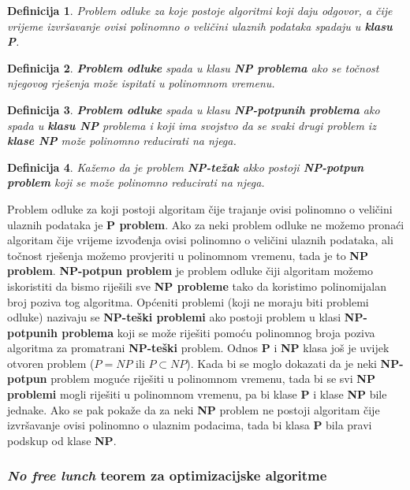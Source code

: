 \documentclass[times, utf8, diplomski, numeric]{fer}
\newtheorem{definition}{Definicija}
\begin{document}
\begin{definition}
Problem odluke za koje postoje algoritmi koji daju odgovor, a čije vrijeme izvršavanje ovisi polinomno o veličini ulaznih podataka spadaju u \textbf{klasu P}.
\end{definition}

\begin{definition}
\textbf{Problem odluke} spada u klasu \textbf{NP problema} ako se točnost njegovog rješenja može ispitati u polinomnom vremenu. 
\end{definition}

\begin{definition}
\textbf{Problem odluke} spada u klasu \textbf{NP-potpunih problema} ako spada u \textbf{klasu NP} problema i koji ima svojstvo da se svaki drugi problem iz \textbf{klase NP} može polinomno reducirati na njega. 
\end{definition}

\begin{definition}
Kažemo da je problem \textbf{NP-težak} akko postoji \textbf{NP-potpun problem} koji se može polinomno reducirati na njega.
\end{definition}

Problem odluke za koji postoji algoritam čije trajanje ovisi polinomno o veličini ulaznih podataka je \textbf{P problem}. Ako za neki problem odluke ne možemo pronaći algoritam čije vrijeme izvođenja ovisi polinomno o veličini ulaznih podataka, ali točnost rješenja možemo provjeriti u polinomnom vremenu, tada je to \textbf{NP problem}. \textbf{NP-potpun problem} je problem odluke čiji algoritam možemo iskoristiti da bismo riješili sve \textbf{NP probleme} tako da koristimo polinomijalan broj poziva tog algoritma. Općeniti problemi (koji ne moraju biti problemi odluke) nazivaju se \textbf{NP-teški problemi} ako postoji problem u klasi \textbf{NP-potpunih problema} koji se može riješiti pomoću polinomnog broja poziva algoritma za promatrani \textbf{NP-teški} problem. Odnos \textbf{P} i \textbf{NP} klasa još je uvijek otvoren problem ($P=NP$ ili $P\subset NP$). Kada bi se moglo dokazati da je neki \textbf{NP-potpun} problem moguće riješiti u polinomnom vremenu, tada bi se svi \textbf{NP problemi} mogli riješiti u polinomnom vremenu, pa bi klase \textbf{P} i klase \textbf{NP} bile jednake. Ako se pak pokaže da za neki \textbf{NP} problem ne postoji algoritam čije izvršavanje ovisi polinomno o ulaznim podacima, tada bi klasa \textbf{P} bila pravi podskup od klase \textbf{NP}.

\subsubsection{\emph{No free lunch} teorem za optimizacijske algoritme}
\end{document}
